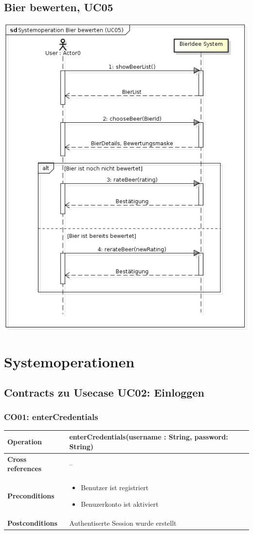 \documentclass[10pt,a4paper]{scrartcl}
\begin{document}
\subsection{Bier bewerten, UC05}
\includegraphics[width=\textwidth]{ssd_uc05.png}

\section{Systemoperationen}
\subsection{Contracts zu Usecase UC02: Einloggen}
\subsubsection{CO01: enterCredentials}
\begin{tabular}{|l|p{}|}
\hline
 \textbf{Operation} & enterCredentials(username : String, password: String) \\ 
\hline
\textbf{Cross references} & -- \\ 
\hline 
\textbf{Preconditions} & \begin{itemize} 
							\item Benutzer ist registriert
							\item Benuzerkonto ist aktiviert 
						  \end{itemize}\\
\hline 
\textbf{Postconditions} & Authentiserte Session wurde erstellt \\
\hline
\end{tabular}
\end{document}
